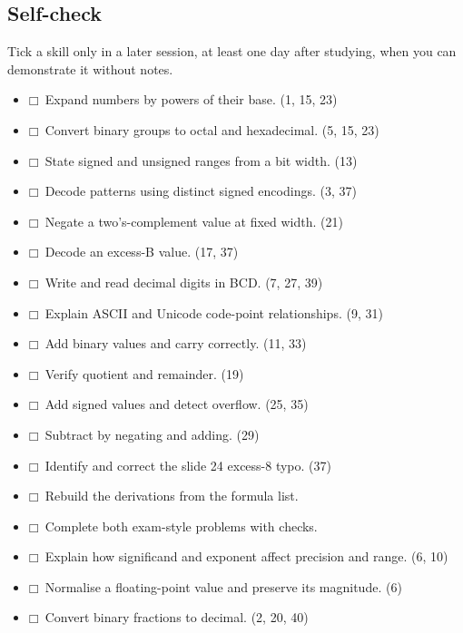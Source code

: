 \documentclass[11pt]{article}
\begin{document}
\begin{keepsection}
\section{Self-check}

Tick a skill only in a later session, at least one day after studying, when you can demonstrate it without notes.

\begin{itemize}
\item $\mdlgwhtsquare$\  Expand numbers by powers of their base. (1, 15, 23)
\item $\mdlgwhtsquare$\  Convert binary groups to octal and hexadecimal. (5, 15, 23)
\item $\mdlgwhtsquare$\  State signed and unsigned ranges from a bit width. (13)
\item $\mdlgwhtsquare$\  Decode patterns using distinct signed encodings. (3, 37)
\item $\mdlgwhtsquare$\  Negate a two’s-complement value at fixed width. (21)
\item $\mdlgwhtsquare$\  Decode an excess-B value. (17, 37)
\item $\mdlgwhtsquare$\  Write and read decimal digits in BCD. (7, 27, 39)
\item $\mdlgwhtsquare$\  Explain ASCII and Unicode code-point relationships. (9, 31)
\item $\mdlgwhtsquare$\  Add binary values and carry correctly. (11, 33)
\item $\mdlgwhtsquare$\  Verify quotient and remainder. (19)
\item $\mdlgwhtsquare$\  Add signed values and detect overflow. (25, 35)
\item $\mdlgwhtsquare$\  Subtract by negating and adding. (29)
\item $\mdlgwhtsquare$\  Identify and correct the slide 24 excess-8 typo. (37)
\item $\mdlgwhtsquare$\  Rebuild the derivations from the formula list.
\item $\mdlgwhtsquare$\  Complete both exam-style problems with checks.
\item $\mdlgwhtsquare$\  Explain how significand and exponent affect precision and range. (6, 10)
\item $\mdlgwhtsquare$\  Normalise a floating-point value and preserve its magnitude. (6)
\item $\mdlgwhtsquare$\  Convert binary fractions to decimal. (2, 20, 40)

\end{itemize}
\end{keepsection}
\end{document}
